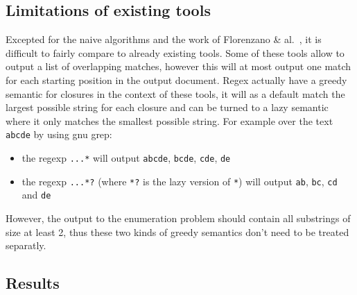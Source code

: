 \documentclass[12px]{article}
\begin{document}
    \subsection{Limitations of existing tools}

      Excepted for the naive algorithms and the work of Florenzano \&
      al.~, it is difficult to fairly compare to already
      existing tools. Some of these tools allow to output a list of overlapping
      matches, however this will at most output one match for each starting
      position in the output document. Regex actually have a greedy semantic
      for closures in the context of these tools, it will as a default match
      the largest possible string for each closure and can be turned to a lazy
      semantic where it only matches the smallest possible string. For
      example over the text \texttt{abcde} by using gnu grep:
        \begin{itemize}
          \item the regexp \texttt{...*} will output \texttt{abcde},
            \texttt{bcde}, \texttt{cde}, \texttt{de}
          \item the regexp \texttt{...*?} (where \texttt{*?} is the lazy
            version of \texttt{*}) will output \texttt{ab}, \texttt{bc},
            \texttt{cd} and \texttt{de}
        \end{itemize}
      However, the output to the enumeration problem should contain all
      substrings of size at least 2, thus these two kinds of greedy semantics
      don't need to be treated separatly.

    \subsection{Results}


  \pagebreak
  
  
\end{document}
